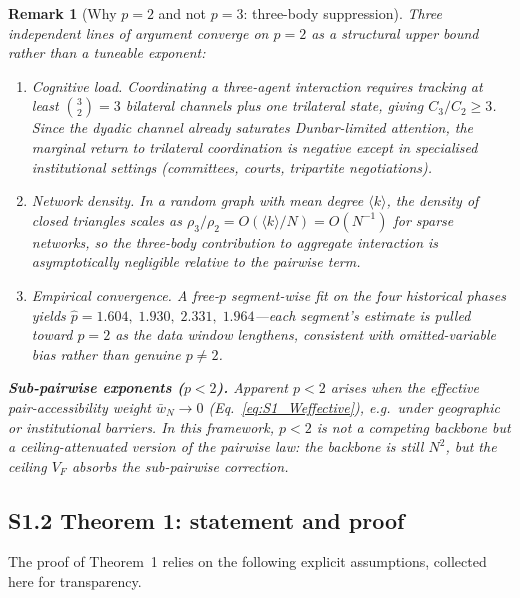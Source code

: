 \documentclass[11pt]{article}
\newtheorem{remark}{Remark}
\begin{document}
\begin{remark}[Why $p=2$ and not $p=3$: three-body suppression]
\label{rmk:p2_suppression}
Three independent lines of argument converge on $p=2$ as a structural
upper bound rather than a tuneable exponent:

\begin{enumerate}
\item \emph{Cognitive load.}
Coordinating a three-agent interaction requires tracking at least
$\binom{3}{2}=3$ bilateral channels plus one trilateral state,
giving $C_3/C_2 \ge 3$.
Since the dyadic channel already saturates Dunbar-limited attention,
the marginal return to trilateral coordination is negative except in
specialised institutional settings (committees, courts, tripartite
negotiations).

\item \emph{Network density.}
In a random graph with mean degree $\langle k \rangle$, the density
of closed triangles scales as
$\rho_3/\rho_2 = O(\langle k \rangle / N) = O(N^{-1})$
for sparse networks, so the three-body contribution to aggregate
interaction is asymptotically negligible relative to the pairwise term.

\item \emph{Empirical convergence.}
A free-$p$ segment-wise fit on the four historical phases yields
$\hat{p} = 1.604,\;1.930,\;2.331,\;1.964$---each segment's estimate
is pulled toward $p=2$ as the data window lengthens, consistent with
omitted-variable bias rather than genuine $p\neq 2$.
\end{enumerate}

\noindent
\textbf{Sub-pairwise exponents ($p<2$).}
Apparent $p<2$ arises when the effective pair-accessibility weight
$\bar{w}_N \to 0$ (Eq.~\eqref{eq:S1_Weffective}), e.g.\ under
geographic or institutional barriers.
In this framework, $p<2$ is not a competing backbone but a
\emph{ceiling-attenuated} version of the pairwise law:
the backbone is still $N^2$, but the ceiling $V_F$ absorbs the
sub-pairwise correction.
\end{remark}

\subsection*{S1.2 Theorem 1: statement and proof}

The proof of Theorem~1 relies on the following explicit assumptions, collected here for transparency.
\end{document}

